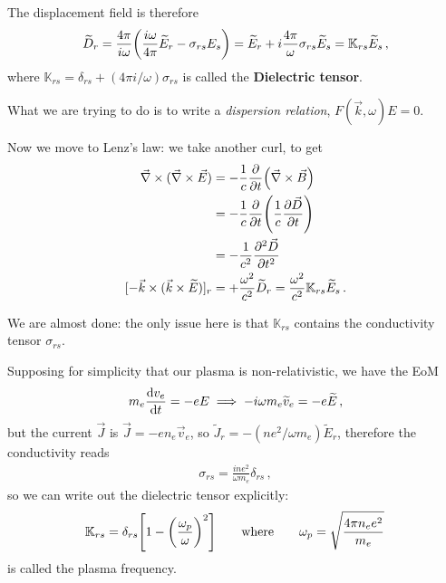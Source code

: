 \documentclass[main.tex]{subfiles}
\begin{document}
The displacement field is therefore 
%
\begin{align}
\widetilde{D}_r
= \frac{4 \pi }{ i \omega } \qty(\frac{i \omega }{ 4 \pi } \widetilde{E}_r - \sigma_{rs} E_s) = \widetilde{E}_r
+ i \frac{4 \pi }{\omega } \sigma_{rs} \widetilde{E}_s 
= \mathbb{K}_{rs} \widetilde{E}_s
\,,
\end{align}
%
where \(\mathbb{K}_{rs} = \delta_{rs} + (4 \pi i / \omega ) \sigma_{rs}\) is called the \textbf{Dielectric tensor}.

What we are trying to do is to write a \emph{dispersion relation}, \(F(\vec{k}, \omega ) E = 0\). 

Now we move to Lenz's law: we take another curl, to get 
%
\begin{subequations}
\begin{align}
\vec{\nabla} \times (\vec{\nabla} \times \vec{E}) &= - \frac{1}{c} \pdv{}{t} \qty(\vec{\nabla} \times \vec{B})   \\
&= - \frac{1}{c} \pdv{}{t} \qty( \frac{1}{c}\pdv{\vec{D}}{t})  \\
&= - \frac{1}{c^2} \pdv[2]{\vec{D}}{t}  \\
[- \vec{k} \times (\vec{k} \times \widetilde{E})]_r &= + \frac{\omega^2}{c^2} \widetilde{D}_r = \frac{\omega^2}{c^2} \mathbb{K}_{rs} \widetilde{E}_s
\,.
\end{align}
\end{subequations}

We are almost done: the only issue here is that \(\mathbb{K}_{rs}\) contains the conductivity tensor \(\sigma_{rs}\). 

Supposing for simplicity  that our plasma is non-relativistic, we have the EoM 
%
\begin{align}
m_e \dv{v_e}{t} = - e E \implies 
- i \omega m_e \widetilde{v}_e = - e \widetilde{E}
\,,
\end{align}
%
but the current \(\vec{J}\) is \(\vec{J} = - e n_e \vec{v}_e\), so \(\widetilde{J}_r = - (n e^2 / \omega m_e) \widetilde{E}_r\), therefore the conductivity reads 
%
\begin{align}
\sigma_{rs} = \frac{i n e^2}{\omega m_e} \delta_{rs} 
\,,
\end{align}
%
so we can write out the dielectric tensor explicitly: 
%
\begin{align}
\mathbb{K}_{rs} = \delta_{rs} \qty[ 1 - \qty(\frac{\omega_p}{\omega })^2]
\qquad \text{where} \qquad
\omega_p = \sqrt{\frac{ 4 \pi n_e e^2}{m_e}}
\,
\end{align}
%
is called the plasma frequency.
\end{document}
